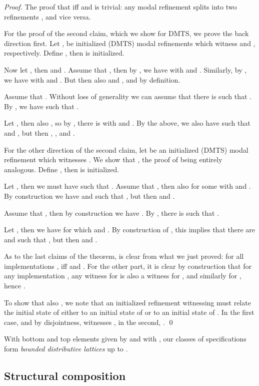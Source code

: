 \documentclass[twocolumn]{svjour3-dummy}
\begin{document}
\begin{proof}The proof that  iff  and
   is trivial: any modal refinement  splits into two refinements ,  and vice versa.

  For the proof of the second claim, which we show for DMTS, we prove
  the back direction first.  Let ,
   be initialized (DMTS) modal refinements
  which witness  and , respectively.
  Define , then  is initialized.

  Now let , then  and .  Assume that , then by
  , we have  with 
  and .  Similarly, by , we have
   with  and .
  But then also  and , and  by definition.

  Assume that .  Without loss of generality we can
  assume that there is  such that .  By
  , we have  such that .

  Let , then also , so by
  , there is  with  and
  .  By the above, we also have 
  such that  and , but then , , and .

  For the other direction of the second claim, let  be an initialized (DMTS) modal refinement
  which witnesses .  We show that , the proof of  being entirely analogous.  Define
  , then  is initialized.

  Let , then we must have  such that .  Assume that , then also
   for some  with  and
  .  By construction we have  and  such that , but then
   and .

  Assume that , then by construction we have .  By , there is
   such that .

  Let , then we have  for
  which  and .  By construction
  of , this implies that there are  and  such that , but then  and .

  As to the last claims of the theorem,  is clear from what we just proved: for all
  implementations ,  iff 
  and .  For the other part, it is clear by construction
  that for any implementation , any witness  for 
  is also a witness for , and similarly for
  , hence .

  To show that also , we note that an initialized refinement 
  witnessing  must relate the initial state of
   either to an initial state of  or to an initial state of
  .  In the first case, and by disjointness,  witnesses
  , in the second, .  \qed
\end{proof}

With bottom and top elements given by  and  with , our classes of specifications form
\emph{bounded distributive lattices} up to .

\subsection{Structural composition}
\label{se:comp}
\end{document}
